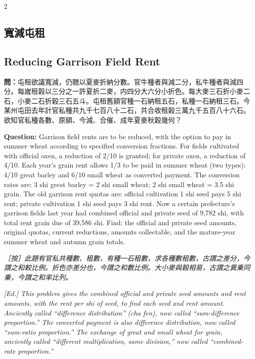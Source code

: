 \documentclass[11pt,a4paper]{article}
\newcommand{\QuestionText}[1]{\par\noindent\textbf{\color{problemcolor}問：}#1\par}
\newcommand{\EdNoteText}[1]{\par\noindent\textit{\color{ednotecolor}［按］#1}\par}
\newcommand{\QuestionEn}[1]{\par\noindent\textbf{\color{problemcolor}Question:} #1\par}
\newcommand{\EdNoteEn}[1]{\par\noindent\textit{\color{ednotecolor}[Ed.] #1}\par}
\begin{document}
\begin{paracol}{2}

\subsection*{\color{sectioncolor}寬減屯租}
\switchcolumn
\subsection*{\color{sectioncolor}Reducing Garrison Field Rent}
\switchcolumn*

\QuestionText{屯租欲議寬減，仍聴以夏麥折納分數。官牛種者與減二分，私牛種者與減四分。每嵗租榖以三分之一許夏折二麥，内四分大六分小折色。每大麥三石折小麥二石，小麥二石折榖三石五斗。屯租舊額官種一石納租五石，私種一石納租三石。今某州屯田去年計官私種共九千七百八十二石，共合收租榖三萬九千五百八十六石。欲知官私種各數、原額、今減、合催、成年夏麥秋榖幾何？}
\switchcolumn
\QuestionEn{Garrison field rents are to be reduced, with the option to pay in summer wheat according to specified conversion fractions. For fields cultivated with official oxen, a reduction of 2/10 is granted; for private oxen, a reduction of 4/10. Each year's grain rent allows 1/3 to be paid in summer wheat (two types): 4/10 great barley and 6/10 small wheat as converted payment. The conversion rates are: 3 shi great barley = 2 shi small wheat; 2 shi small wheat = 3.5 shi grain. The old garrison rent quotas are: official cultivation 1 shi seed pays 5 shi rent; private cultivation 1 shi seed pays 3 shi rent. Now a certain prefecture's garrison fields last year had combined official and private seed of 9,782 shi, with total rent grain due of 39,586 shi. Find: the official and private seed amounts, original quotas, current reductions, amounts collectable, and the mature-year summer wheat and autumn grain totals.}
\switchcolumn*

\EdNoteText{此題有官私共種數、租數，有種一石租數，求各種數租數，古謂之差分，今謂之和較比例。折色亦差分也，今謂之和數比例。大小麥與榖相易，古謂之異乗同乗，今謂之和率比列。}
\switchcolumn
\EdNoteEn{This problem gives the combined official and private seed amounts and rent amounts, with the rent per shi of seed, to find each seed and rent amount. Anciently called ``difference distribution'' (cha fen), now called ``sum-difference proportion.'' The converted payment is also difference distribution, now called ``sum-ratio proportion.'' The exchange of great and small wheat for grain, anciently called ``different multiplication, same division,'' now called ``combined-rate proportion.''}
\switchcolumn*


\end{paracol}
\end{document}

